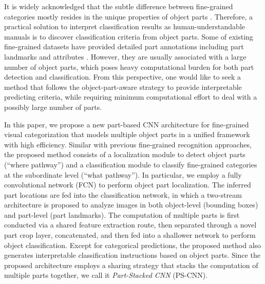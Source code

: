 \documentclass[10pt,twocolumn,letterpaper]{article}
\begin{document}
It is widely acknowledged that the subtle difference between fine-grained categories mostly resides in the unique properties of object parts \cite{rosch1976basic,berg2013poof,chai2013symbiotic,maji2014part,zhang2014part}. Therefore, a practical solution to interpret classification results as human-understandable manuals is to discover classification criteria from object parts. Some of existing fine-grained datasets have provided detailed part annotations including part landmarks and attributes \cite{wah2011caltech,maji2013fine}. However, they are usually associated with a large number of object parts, which poses heavy computational burden for both part detection and classification. From this perspective, one would like to seek a method that follows the object-part-aware strategy to provide interpretable predicting criteria, while requiring minimum computational effort to deal with a possibly large number of parts.



In this paper, we propose a new part-based CNN architecture for fine-grained visual categorization that models multiple object parts in a unified framework with high efficiency.
Similar with previous fine-grained recognition approaches, the proposed method consists of a localization module to detect object parts (``where pathway'') and a classification module to classify fine-grained categories at the subordinate level (``what pathway''). In particular, we employ a fully convolutional network (FCN) to perform object part localization. The inferred part locations are fed into the classification network, in which a two-stream architecture is proposed to analyze images in both object-level (bounding boxes) and part-level (part landmarks).
The computation of multiple parts is first conducted via a shared feature extraction route, then separated through a novel part crop layer, concatenated, and then fed into a shallower network to perform object classification.
Except for categorical predictions, the proposed method also generates interpretable classification instructions based on object parts.
Since the proposed architecture employs a sharing strategy that stacks the computation of multiple parts together, we call it \emph{Part-Stacked CNN} (PS-CNN).
\end{document}
